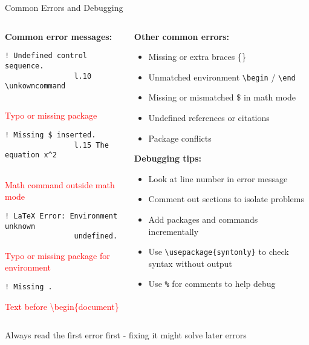 \begin{frame}[fragile]{Common Errors and Debugging}
	\begin{columns}
		\begin{column}{0.5\textwidth}
			\textbf{Common error messages:}
			
			\begin{lstlisting}[language={}]
				! Undefined control sequence.
				l.10 \unkowncommand
				
			\end{lstlisting}
			\textcolor{red}{Typo or missing package}
			
			\begin{lstlisting}[language={}]
				! Missing $ inserted.
				l.15 The equation x^2
				
			\end{lstlisting}
			\textcolor{red}{Math command outside math mode}
			
			\begin{lstlisting}[language={}]
				! LaTeX Error: Environment unknown 
				undefined.
			\end{lstlisting}
			\textcolor{red}{Typo or missing package for environment}
			
			\begin{lstlisting}[language={}]
				! Missing .
				\end{lstlisting}
				\textcolor{red}{Text before \textbackslash begin\{document\}}
			\end{column}
			
			\begin{column}{0.5\textwidth}
				\textbf{Other common errors:}
				\begin{itemize}
					\item Missing or extra braces \{\}
					\item Unmatched environment \texttt{\textbackslash begin} / \texttt{\textbackslash end}
					\item Missing or mismatched \$ in math mode
					\item Undefined references or citations
					\item Package conflicts
				\end{itemize}
				
				\textbf{Debugging tips:}
				\begin{itemize}
					\item Look at line number in error message
					\item Comment out sections to isolate problems
					\item Add packages and commands incrementally
					\item Use \texttt{\textbackslash usepackage\{syntonly\}} to check syntax without output
					\item Use \texttt{\%} for comments to help debug
				\end{itemize}
			\end{column}
		\end{columns}
		
		\begin{warning}
			Always read the first error first - fixing it might solve later errors
		\end{warning}
	\end{frame}
	
